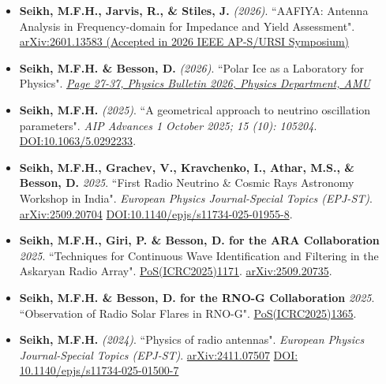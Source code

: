 \documentclass[10pt]{report}
\begin{document}
\begin{itemize}
    \item \textbf{Seikh, M.F.H., Jarvis, R., \& Stiles, J.} {\it (2026)}. ``AAFIYA: Antenna Analysis in Frequency-domain for Impedance and Yield Assessment". \href{https://doi.org/10.48550/arXiv.2601.13583}{arXiv:2601.13583 (Accepted in 2026 IEEE AP-S/URSI Symposium)}

    \vspace{0.1em}
    \noindent
    \item \textbf{Seikh, M.F.H. \& Besson, D.} {\it (2026)}. ``Polar Ice as a Laboratory for Physics". \href{https://drive.google.com/file/d/1eny09TjrDmNsoqKf86RbFbMdMi_LdEsB/view?usp=share_link}{\textit{Page 27-37, Physics Bulletin 2026, Physics Department, AMU}}

    \vspace{0.1em}
    \noindent
    \item \textbf{Seikh, M.F.H.} {\it (2025)}. ``A geometrical approach to neutrino oscillation parameters". {\it AIP Advances 1 October 2025; 15 (10): 105204}. \href{https://doi.org/10.1063/5.0292233}{DOI:10.1063/5.0292233}.

    \vspace{0.1em}
    \noindent
    \item {\bf Seikh, M.F.H., Grachev, V., Kravchenko, I., Athar, M.S., \&  Besson, D.} {\it {2025}}. ``First Radio Neutrino \& Cosmic Rays Astronomy Workshop in India". \textit{European Physics Journal-Special Topics (EPJ-ST)}. \href{https://arxiv.org/abs/2509.20704}{arXiv:2509.20704} \href{https://doi.org/10.1140/epjs/s11734-025-01955-8}{DOI:10.1140/epjs/s11734-025-01955-8}.

    \vspace{0.1em}
    \noindent
    \item {\bf Seikh, M.F.H., Giri, P. \& Besson, D. for the ARA Collaboration} {\it {2025}}. ``Techniques for Continuous Wave Identification and Filtering in the Askaryan Radio Array". \href{https://pos.sissa.it/501/1171/pdf}{PoS(ICRC2025)1171}. \href{https://arxiv.org/abs/2509.20735}{arXiv:2509.20735}.

    \vspace{0.1em}
    \noindent
    \item {\bf Seikh, M.F.H. \& Besson, D. for the RNO-G Collaboration} {\it {2025}}. ``Observation of Radio Solar Flares in RNO-G". \href{https://pos.sissa.it/501/1365/pdf}{PoS(ICRC2025)1365}. 

    \vspace{0.1em}
    \noindent
    \item \textbf{Seikh, M.F.H.} {\it (2024)}. ``Physics of radio antennas". \textit{European Physics Journal-Special Topics (EPJ-ST)}. \href{https://arxiv.org/abs/2411.07507}{arXiv:2411.07507} \href{https://doi.org/10.1140/epjs/s11734-025-01500-7}{DOI: 10.1140/epjs/s11734-025-01500-7}
    

\end{itemize}
\end{document}
